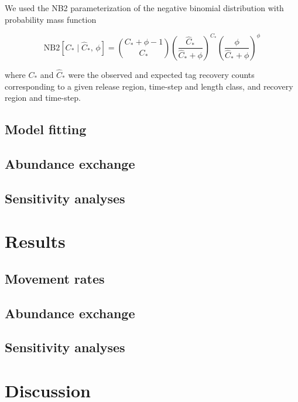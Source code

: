 \documentclass{article}
\begin{document}
We used the NB2 parameterization of the negative binomial distribution with probability mass function

\begin{equation}
  \label{eq:sampling}
  \mathrm{NB2} \! \left[ C_* \mid \widehat{C}_*,\, \phi \right] = \binom{C_* + \phi - 1}{C_*} \left(\frac{\widehat{C}_*}{\widehat{C}_* + \phi}\right)^{C_*} \left( \frac{\phi}{\widehat{C}_* + \phi} \right)^{\phi}
\end{equation}

\noindent where $C_*$ and $\widehat{C}_*$ were the observed and expected tag recovery counts corresponding to a given release region, time-step and length class, and recovery region and time-step.

\subsection{Model fitting}

\subsection{Abundance exchange}

\subsection{Sensitivity analyses}

\section{Results}

\subsection{Movement rates}

\subsection{Abundance exchange}

\subsection{Sensitivity analyses}

\section{Discussion}
\end{document}
